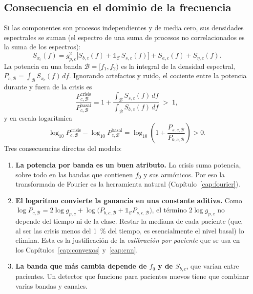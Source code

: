 \subsection{Consecuencia en el dominio de la frecuencia}

Si las componentes son procesos independientes y de media cero, sus densidades espectrales se
suman (el espectro de una suma de procesos no correlacionados es la suma de los espectros):
\begin{equation}
  S_{x_c}(f) = g_{p,c}^2 \Big[ S_{b,c}(f) + \mathds{1}_{\mathcal{C}}\, S_{s,c}(f) \Big] + S_{a,c}(f) + S_{\eta,c}(f).
  \label{eq:espectro_modelo}
\end{equation}
La potencia en una banda $\mathcal{B} = [f_1, f_2)$ es la integral de la densidad espectral,
$P_{c,\mathcal{B}} = \int_{\mathcal{B}} S_{x_c}(f)\,df$. Ignorando artefactos y ruido, el cociente entre la potencia
durante y fuera de la crisis es
\begin{equation}
  \frac{P^{\text{crisis}}_{c,\mathcal{B}}}{P^{\text{basal}}_{c,\mathcal{B}}}
  = 1 + \frac{\int_{\mathcal{B}} S_{s,c}(f)\,df}{\int_{\mathcal{B}} S_{b,c}(f)\,df} \;>\; 1,
\end{equation}
y en escala logarítmica
\begin{equation}
  \log_{10} P^{\text{crisis}}_{c,\mathcal{B}} - \log_{10} P^{\text{basal}}_{c,\mathcal{B}}
  = \log_{10}\!\left(1 + \frac{P_{s,c,\mathcal{B}}}{P_{b,c,\mathcal{B}}}\right) > 0.
  \label{eq:dif_log}
\end{equation}
Tres consecuencias directas del modelo:
\begin{enumerate}
  \item \textbf{La potencia por banda es un buen atributo.} La crisis suma potencia, sobre todo en las
        bandas que contienen $f_0$ y sus armónicos. Por eso la transformada de Fourier es la herramienta
        natural (Capítulo~\ref{cap:fourier}).
  \item \textbf{El logaritmo convierte la ganancia en una constante aditiva.} Como
        $\log P_{c,\mathcal{B}} = 2\log g_{p,c} + \log\!\big(P_{b,c,\mathcal{B}} + \mathds{1}_{\mathcal{C}}P_{s,c,\mathcal{B}}\big)$,
        el término $2\log g_{p,c}$ no depende del tiempo ni de la clase. Restar la mediana de cada
        paciente (que, al ser las crisis menos del 1~\% del tiempo, es esencialmente el nivel basal) lo
        elimina. Esta es la justificación de la \emph{calibración por paciente} que se usa en los
        Capítulos~\ref{cap:convexos} y~\ref{cap:cnn}.
  \item \textbf{La banda que más cambia depende de $f_0$ y de $S_{b,c}$}, que varían entre pacientes. Un
        detector que funcione para pacientes nuevos tiene que combinar varias bandas y canales.
\end{enumerate}

